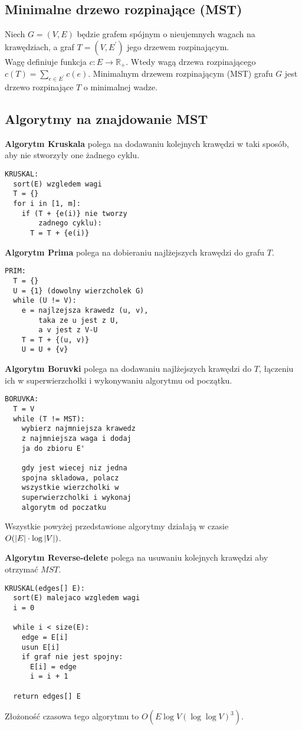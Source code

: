 \subsection*{Minimalne drzewo rozpinające (MST)}
Niech $G = (V, E)$ będzie grafem spójnym o nieujemnych wagach na krawędziach, a
graf $T = (V, E^\prime)$ jego drzewem rozpinającym. \\
Wagę definiuje funkcja $c : E \to \mathbb{R}_+$. Wtedy wagą drzewa rozpinającego
$c(T) = \sum\limits_{e \in E^\prime} c(e)$. Minimalnym drzewem rozpinającym (MST)
grafu $G$ jest drzewo rozpinające $T$ o minimalnej wadze.

\subsection*{Algorytmy na znajdowanie MST}
\textbf{Algorytm Kruskala} polega na dodawaniu kolejnych krawędzi w taki sposób,
aby nie stworzyły one żadnego cyklu.
\begin{lstlisting}[style=code]
KRUSKAL:
  sort(E) wzgledem wagi
  T = {}
  for i in [1, m]:
    if (T + {e(i)} nie tworzy 
        zadnego cyklu):
      T = T + {e(i)}
\end{lstlisting}

\textbf{Algorytm Prima} polega na dobieraniu najlżejszych krawędzi do grafu $T$.
\begin{lstlisting}[style=code]
PRIM:
  T = {}
  U = {1} (dowolny wierzcholek G)
  while (U != V):
    e = najlzejsza krawedz (u, v),
        taka ze u jest z U, 
        a v jest z V-U
    T = T + {(u, v)}  
    U = U + {v}
\end{lstlisting}

\textbf{Algorytm Boruvki} polega na dodawaniu najlżejszych krawędzi do $T$, łączeniu
ich w superwierzchołki i wykonywaniu algorytmu od początku.
\begin{lstlisting}[style=code]
BORUVKA:
  T = V
  while (T != MST):
    wybierz najmniejsza krawedz
    z najmniejsza waga i dodaj
    ja do zbioru E'

    gdy jest wiecej niz jedna
    spojna skladowa, polacz 
    wszystkie wierzcholki w
    superwierzcholki i wykonaj
    algorytm od poczatku
\end{lstlisting}
Wszystkie powyżej przedstawione algorytmy działają w czasie \\
$O(\left| E \right| \cdot \log \left| V \right|)$.

\textbf{Algorytm Reverse-delete} polega na usuwaniu kolejnych krawędzi aby otrzymać $MST$.
\begin{lstlisting}[style=code]
KRUSKAL(edges[] E):
  sort(E) malejaco wzgledem wagi
  i = 0
  
  while i < size(E):
    edge = E[i]
    usun E[i]
    if graf nie jest spojny:
      E[i] = edge
      i = i + 1

  return edges[] E    
\end{lstlisting}
Złożoność czasowa tego algorytmu to $O(E \log V (\log \log V)^3)$.

